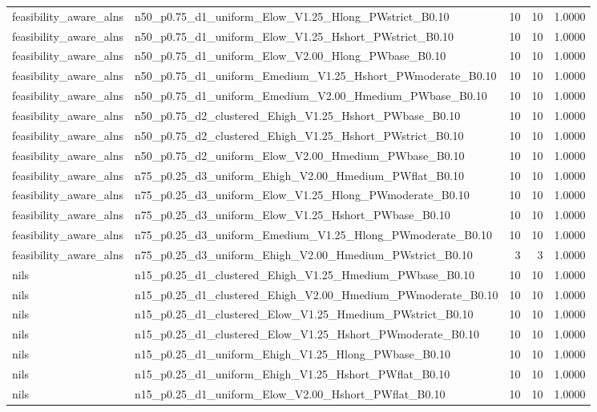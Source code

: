 \begin{tabular}{llrrr}
feasibility_aware_alns & n50_p0.75_d1_uniform_Elow_V1.25_Hlong_PWstrict_B0.10 & 10 & 10 & 1.0000 \\
feasibility_aware_alns & n50_p0.75_d1_uniform_Elow_V1.25_Hshort_PWstrict_B0.10 & 10 & 10 & 1.0000 \\
feasibility_aware_alns & n50_p0.75_d1_uniform_Elow_V2.00_Hlong_PWbase_B0.10 & 10 & 10 & 1.0000 \\
feasibility_aware_alns & n50_p0.75_d1_uniform_Emedium_V1.25_Hshort_PWmoderate_B0.10 & 10 & 10 & 1.0000 \\
feasibility_aware_alns & n50_p0.75_d1_uniform_Emedium_V2.00_Hmedium_PWbase_B0.10 & 10 & 10 & 1.0000 \\
feasibility_aware_alns & n50_p0.75_d2_clustered_Ehigh_V1.25_Hshort_PWbase_B0.10 & 10 & 10 & 1.0000 \\
feasibility_aware_alns & n50_p0.75_d2_clustered_Ehigh_V1.25_Hshort_PWstrict_B0.10 & 10 & 10 & 1.0000 \\
feasibility_aware_alns & n50_p0.75_d2_uniform_Elow_V2.00_Hmedium_PWbase_B0.10 & 10 & 10 & 1.0000 \\
feasibility_aware_alns & n75_p0.25_d3_uniform_Ehigh_V2.00_Hmedium_PWflat_B0.10 & 10 & 10 & 1.0000 \\
feasibility_aware_alns & n75_p0.25_d3_uniform_Elow_V1.25_Hlong_PWmoderate_B0.10 & 10 & 10 & 1.0000 \\
feasibility_aware_alns & n75_p0.25_d3_uniform_Elow_V1.25_Hshort_PWbase_B0.10 & 10 & 10 & 1.0000 \\
feasibility_aware_alns & n75_p0.25_d3_uniform_Emedium_V1.25_Hlong_PWmoderate_B0.10 & 10 & 10 & 1.0000 \\
feasibility_aware_alns & n75_p0.25_d3_uniform_Ehigh_V2.00_Hmedium_PWstrict_B0.10 & 3 & 3 & 1.0000 \\
nils & n15_p0.25_d1_clustered_Ehigh_V1.25_Hmedium_PWbase_B0.10 & 10 & 10 & 1.0000 \\
nils & n15_p0.25_d1_clustered_Ehigh_V2.00_Hmedium_PWmoderate_B0.10 & 10 & 10 & 1.0000 \\
nils & n15_p0.25_d1_clustered_Elow_V1.25_Hmedium_PWstrict_B0.10 & 10 & 10 & 1.0000 \\
nils & n15_p0.25_d1_clustered_Elow_V1.25_Hshort_PWmoderate_B0.10 & 10 & 10 & 1.0000 \\
nils & n15_p0.25_d1_uniform_Ehigh_V1.25_Hlong_PWbase_B0.10 & 10 & 10 & 1.0000 \\
nils & n15_p0.25_d1_uniform_Ehigh_V1.25_Hshort_PWflat_B0.10 & 10 & 10 & 1.0000 \\
nils & n15_p0.25_d1_uniform_Elow_V2.00_Hshort_PWflat_B0.10 & 10 & 10 & 1.0000 \\

\end{tabular}
